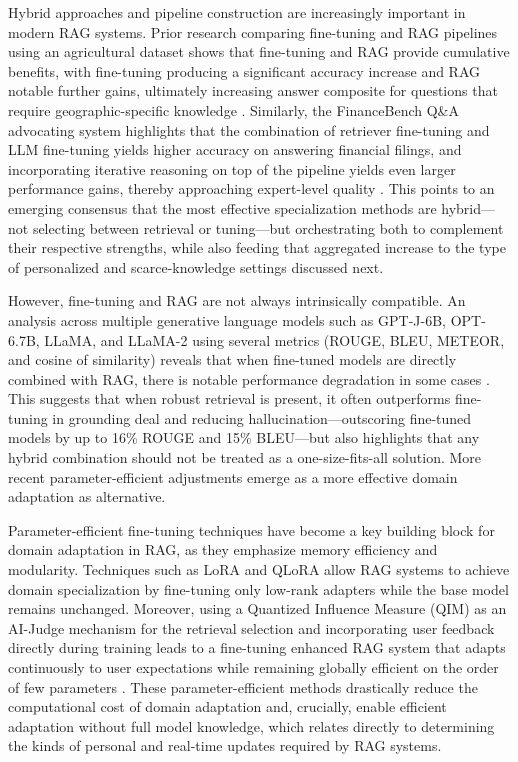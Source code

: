 \documentclass[11pt]{article}
\begin{document}
Hybrid approaches and pipeline construction are increasingly important in modern RAG systems. Prior research comparing fine-tuning and RAG pipelines using an agricultural dataset shows that fine-tuning and RAG provide cumulative benefits, with fine-tuning producing a significant accuracy increase and RAG notable further gains, ultimately increasing answer composite for questions that require geographic-specific knowledge \cite{ref213}. Similarly, the FinanceBench Q\&A advocating system highlights that the combination of retriever fine-tuning and LLM fine-tuning yields higher accuracy on answering financial filings, and incorporating iterative reasoning on top of the pipeline yields even larger performance gains, thereby approaching expert-level quality \cite{ref214}. This points to an emerging consensus that the most effective specialization methods are hybrid---not selecting between retrieval or tuning---but orchestrating both to complement their respective strengths, while also feeding that aggregated increase to the type of personalized and scarce-knowledge settings discussed next.

However, fine-tuning and RAG are not always intrinsically compatible. An analysis across multiple generative language models such as GPT-J-6B, OPT-6.7B, LLaMA, and LLaMA-2 using several metrics (ROUGE, BLEU, METEOR, and cosine of similarity) reveals that when fine-tuned models are directly combined with RAG, there is notable performance degradation in some cases \cite{ref215}. This suggests that when robust retrieval is present, it often outperforms fine-tuning in grounding deal and reducing hallucination---outscoring fine-tuned models by up to 16\% ROUGE and 15\% BLEU---but also highlights that any hybrid combination should not be treated as a one-size-fits-all solution. More recent parameter-efficient adjustments emerge as a more effective domain adaptation as alternative.

Parameter-efficient fine-tuning techniques have become a key building block for domain adaptation in RAG, as they emphasize memory efficiency and modularity. Techniques such as LoRA and QLoRA allow RAG systems to achieve domain specialization by fine-tuning only low-rank adapters while the base model remains unchanged. Moreover, using a Quantized Influence Measure (QIM) as an AI-Judge mechanism for the retrieval selection and incorporating user feedback directly during training leads to a fine-tuning enhanced RAG system that adapts continuously to user expectations while remaining globally efficient on the order of few parameters \cite{ref216}. These parameter-efficient methods drastically reduce the computational cost of domain adaptation and, crucially, enable efficient adaptation without full model knowledge, which relates directly to determining the kinds of personal and real-time updates required by RAG systems.
\end{document}
